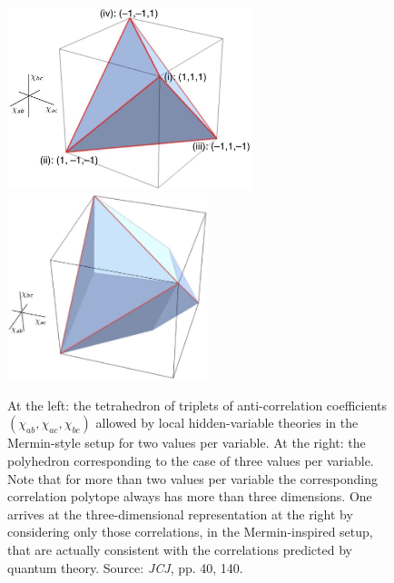\documentclass[12pt,english,twoside]{article}
\numberwithin{equation}{section}
\begin{document}
\begin{figure}
 \centering
   \includegraphics[width=2.8in]{tetrahedron} $\qquad\qquad$ \includegraphics[width=2.3in]{polytope-spin1} 
   \caption{At the left: the tetrahedron of triplets of anti-correlation coefficients $(\chi_{ab}, \chi_{ac}, \chi_{bc})$ allowed by local hidden-variable theories in the Mermin-style setup for two values per variable. At the right: the polyhedron corresponding to the case of three values per variable. Note that for more than two values per variable the corresponding correlation polytope always has more than three dimensions. One arrives at the three-dimensional representation at the right by considering only those correlations, in the Mermin-inspired setup, that are actually consistent with the correlations predicted by quantum theory. Source: \emph{JCJ}, pp. 40, 140.}
   \label{fig:tetrahedron}
   \vspace{-.6cm}
\end{figure}
\end{document}
